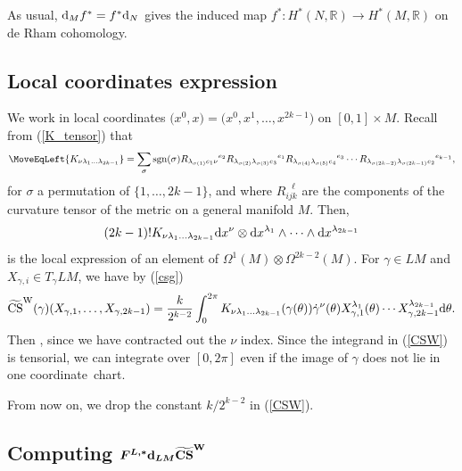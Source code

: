 \documentclass[10pt,a4paper]{amsart}
\numberwithin{equation}{section}
\theoremstyle{definition}
\newcommand{\BbR}{{\mathbb R}}
\newcommand{\R}{\BbR}
\newcommand{\bm}{ M}
\newcommand{\ocs}{\widetilde{{\rm CS}}}
\newcommand{\sgn}{{\rm sgn}}
\newcommand{\itbm}{[0,1]\times M}
\begin{document}
As usual, ${\rm d}_Mf^* = f^*{\rm d}_N$ gives the induced map $f^*\colon H^*(N,\R) \to H^*(M,\R)$ on de Rham cohomology.

\subsection{Local coordinates expression}%

We work in local coordinates
$\bigl(x^0, x\bigr) = \bigl(x^0, x^1,\dots, x^{2k-1}\bigr)$ on $\itbm$.
Recall from (\ref{K_tensor}) that%
\begin{align*}%
\MoveEqLeft{ K_{\nu \lambda_1 \dots \lambda_{2k-1}} }
= \sum_{\sigma } \sgn({\sigma})
R_{\lambda_{\sigma (1)} e_1 \nu}{}^{e_{2}}
R_{\lambda_{\sigma (2) } \lambda_{\sigma (3)} e_{3}}{}^{e_1}
R_{\lambda_{\sigma (4) } \lambda_{\sigma (5)} e_{4}}{}^{e_{3}}
\cdots
R_{\lambda_{\sigma (2k-2) } \lambda_{\sigma (2k-1)} e_{2}}{}^{e_{k-1}},
\nonumber
\end{align*}
for $\sigma$ a permutation of $\{1,\dots,2k-1\}$, and where $R_{ijk}^{\ \ \ \ell}$ are the components of the curvature tensor of the metric on a general manifold $M$. Then,
\begin{equation}\label{K}(2k-1)! K_{\nu \lambda_1 \dots \lambda_{2k-1}}{\rm d}x^\nu\otimes {\rm d}x^{\lambda_1}\wedge\cdots\wedge {\rm d}x^{\lambda_{2k-1}}
\end{equation}
is the local expression of an element of
$\Omega^1( {\bm}) \otimes \Omega^{2k-2} (\bm)$.
For $\gamma\in L\bm$ and $X_{\gamma,i}\in T_\gamma L\bm$, we have by (\ref{csg})
\begin{equation}
\label{CSW}
\ocs^{\rm W} (\gamma ) (X_{\gamma, 1} ,\dots, X_{\gamma , 2k-1}) \\
= \frac{k}{2^{k-2}}\int_0^{2\pi}
 K_{\nu \lambda_1 \dots \lambda_{2k-1}} (\gamma (\theta))
{\dot \gamma}^{\nu} (\theta )
X_{\gamma ,1}^{\lambda_{1}}(\theta ) \cdots X_{\gamma , 2k-1}^{\lambda_{2k-1}}
 {\rm d}\theta.
\end{equation}
Then \smash{$\ocs^{\rm W}
\in \Omega^{2k-1} (L{\bm})$}, since we have contracted out the $\nu$ index. Since the integrand in (\ref{CSW}) is tensorial, we can integrate over $[0, 2\pi]$ even if the image of $\gamma$ does not lie in one coordinate~chart.

From now on, we drop the constant $k/2^{k-2}$ in (\ref{CSW}).

\subsection[Computing F\^{}\{L,*\} d\_\{LM\} CS\^{}W]{Computing $\boldsymbol{F^{L,*}{\rm d}_{L\bm} \ocs^{\rm W}}$}%
\end{document}
